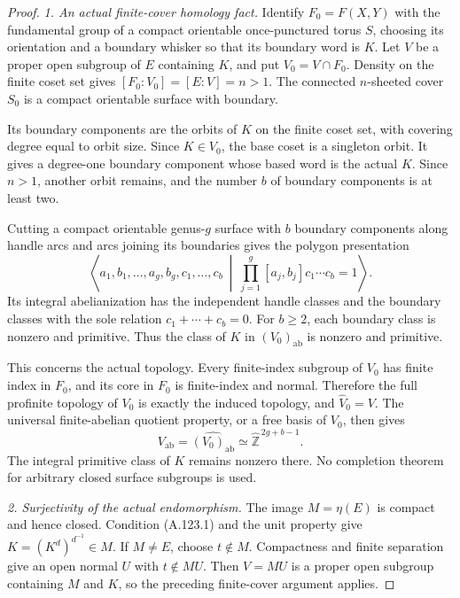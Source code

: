 \begin{proof}
\emph{1. An actual finite-cover homology fact.}
Identify \(F_0=F(X,Y)\) with the fundamental group of a compact
orientable once-punctured torus \(S\), choosing its orientation
and a boundary whisker so that its boundary word is \(K\).
Let \(V\) be a proper open subgroup of \(E\) containing \(K\),
and put \(V_0=V\cap F_0\).
Density on the finite coset set gives
\([F_0:V_0]=[E:V]=n>1\).
The connected \(n\)-sheeted cover \(S_0\) is a compact orientable
surface with boundary.

Its boundary components are the orbits of \(K\) on the finite
coset set, with covering degree equal to orbit size.
Since \(K\in V_0\), the base coset is a singleton orbit.
It gives a degree-one boundary component whose based word is
the actual \(K\). Since \(n>1\), another orbit remains, and
the number \(b\) of boundary components is at least two.

Cutting a compact orientable genus-\(g\) surface with \(b\) boundary
components along handle arcs and arcs joining its boundaries
gives the polygon presentation
\[
 \left\langle
 a_1,b_1,\ldots,a_g,b_g,c_1,\ldots,c_b
 \ \middle|\
 \prod_{j=1}^g[a_j,b_j]c_1\cdots c_b=1
 \right\rangle .
\]
Its integral abelianization has the independent handle classes
and the boundary classes with the sole relation
\(c_1+\cdots+c_b=0\). For \(b\geq2\), each boundary class is
nonzero and primitive. Thus the class of \(K\) in
\((V_0)_{\mathrm{ab}}\) is nonzero and primitive.

This concerns the actual topology. Every finite-index subgroup
of \(V_0\) has finite index in \(F_0\), and its core in \(F_0\)
is finite-index and normal. Therefore the full profinite topology
of \(V_0\) is exactly the induced topology, and
\(\widehat V_0=V\). The universal finite-abelian quotient
property, or a free basis of \(V_0\), then gives
\[
 V_{\mathrm{ab}}
   =\widehat{(V_0)_{\mathrm{ab}}}
   \simeq\widehat{\mathbb Z}^{\,2g+b-1}.
 \]
The integral primitive class of \(K\) remains nonzero there.
No completion theorem for arbitrary closed surface subgroups
is used.

\emph{2. Surjectivity of the actual endomorphism.}
The image \(M=\eta(E)\) is compact and hence closed.
Condition (A.123.1) and the unit property give
\(K=(K^d)^{d^{-1}}\in M\).
If \(M\ne E\), choose \(t\notin M\). Compactness and finite
separation give an open normal \(U\) with \(t\notin MU\).
Then \(V=MU\) is a proper open subgroup containing \(M\)
and \(K\), so the preceding finite-cover argument applies.


\end{proof}
